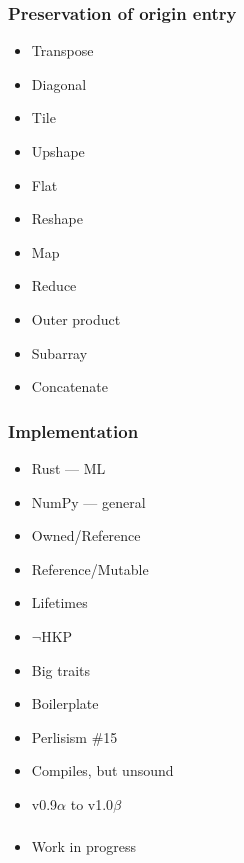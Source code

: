 \documentclass[xetex,mathserif,serif]{beamer}
\begin{document}
\begin{frame}
  \frametitle{Preservation of origin entry}
  
  \begin{multicols}{2}
    \begin{itemize}
      \item Transpose
      \item Diagonal
      \item Tile
      \item Upshape
      \item Flat
      \item Reshape
      \vfill
      \columnbreak

      \item Map
      \item Reduce
      \item Outer product
      \item Subarray\\[2em]
      \item Concatenate
    \end{itemize}
  \end{multicols}
\end{frame}

\begin{frame}
  \frametitle{Implementation}
  
  \begin{multicols}{2}
  \begin{itemize}
    \item Rust --- ML
    \item NumPy --- general
    \item Owned/Reference
    \item Reference/Mutable
    \item Lifetimes
    \item $\neg$HKP
    \columnbreak

    \item Big traits
    \item Boilerplate
    \item Perlisism \#15
    \item Compiles, but unsound
    \item v0.9$\alpha$ to v1.0$\beta$
  \end{itemize}
  \end{multicols}
\end{frame}

\begin{frame}
  \frametitle{}
  \begin{itemize}
    \item Work in progress
  \end{itemize}
\end{frame}
\end{document}
